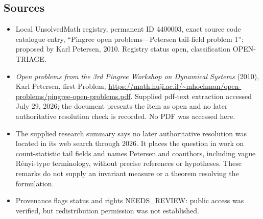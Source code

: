 \documentclass[11pt]{article}
\begin{document}
\subsection{Sources}
\begin{itemize}
\item Local UnsolvedMath registry, permanent ID 4400003, exact source code catalogue entry, ``Pingree open problems---Petersen tail-field problem 1''; proposed by Karl Petersen, 2010. Registry status open, classification OPEN-TRIAGE.
\item \emph{Open problems from the 3rd Pingree Workshop on Dynamical Systems} (2010), Karl Petersen, first Problem, \url{https://math.huji.ac.il/~mhochman/open-problems/pingree-open-problems.pdf}. Supplied pdf-text extraction accessed July 29, 2026; the document presents the item as open and no later authoritative resolution check is recorded. No PDF was accessed here.
\item The supplied research summary says no later authoritative resolution was located in its web search through 2026. It places the question in work on count-statistic tail fields and names Petersen and coauthors, including vague R\'enyi-type terminology, without precise references or hypotheses. These remarks do not supply an invariant measure or a theorem resolving the formulation.
\item Provenance flags status and rights NEEDS\_REVIEW: public access was verified, but redistribution permission was not established.
\end{itemize}
\end{document}
